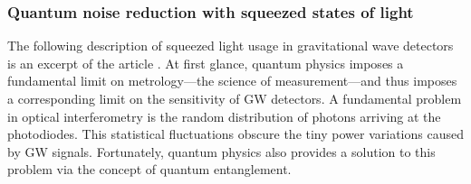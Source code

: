 \newcommand{\tcr}{\textcolor{red}}
\FloatBarrier
\subsubsection{Quantum noise reduction with squeezed states of light}\label{subsec:QNRsqz}
The following description of squeezed light usage in gravitational wave detectors is an excerpt of the article \cite{SqueezingSchnabel2010}. 
At first glance, quantum physics imposes a fundamental limit on metrology---the science of measurement---and thus imposes a corresponding limit on the sensitivity of GW detectors.  A fundamental problem in optical interferometry is
the random distribution of photons arriving at the photodiodes.  This statistical fluctuations obscure the tiny power variations caused by GW signals. Fortunately, quantum physics also provides a solution to this problem via the concept of quantum entanglement.

